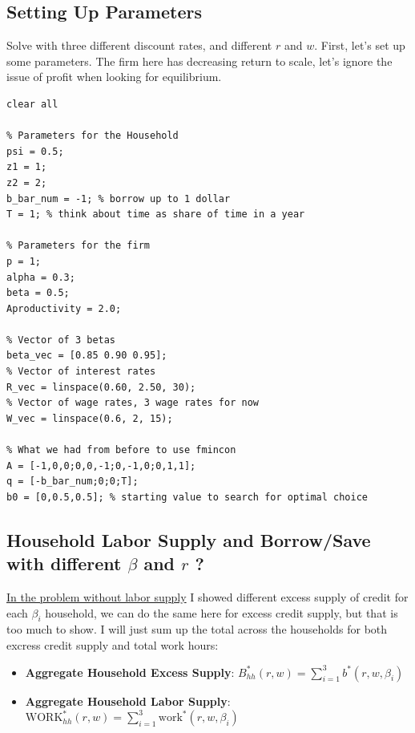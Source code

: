 \documentclass[
]{book}
\begin{document}
\hypertarget{setting-up-parameters}{%
\subsection{Setting Up Parameters}\label{setting-up-parameters}}

Solve with three different discount rates, and different \(r\) and \(w\).
First, let's set up some parameters. The firm here has decreasing return
to scale, let's ignore the issue of profit when looking for equilibrium.

\begin{verbatim}
clear all

% Parameters for the Household
psi = 0.5;
z1 = 1;
z2 = 2;
b_bar_num = -1; % borrow up to 1 dollar
T = 1; % think about time as share of time in a year

% Parameters for the firm
p = 1;
alpha = 0.3;
beta = 0.5;
Aproductivity = 2.0;

% Vector of 3 betas
beta_vec = [0.85 0.90 0.95];
% Vector of interest rates
R_vec = linspace(0.60, 2.50, 30);
% Vector of wage rates, 3 wage rates for now
W_vec = linspace(0.6, 2, 15);

% What we had from before to use fmincon
A = [-1,0,0;0,0,-1;0,-1,0;0,1,1];
q = [-b_bar_num;0;0;T];
b0 = [0,0.5,0.5]; % starting value to search for optimal choice
\end{verbatim}

\hypertarget{household-labor-supply-and-borrowsave-with-different-beta-and-r}{%
\subsection{\texorpdfstring{Household Labor Supply and Borrow/Save with different \(\beta\) and \(r\) ?}{Household Labor Supply and Borrow/Save with different \textbackslash beta and r ?}}\label{household-labor-supply-and-borrowsave-with-different-beta-and-r}}

\href{https://fanwangecon.github.io/Math4Econ/equilibrium/equilibrium_constrainedborrow.html}{In the problem without labor
supply}
I showed different excess supply of credit for each \(\beta_i\) household,
we can do the same here for excess credit supply, but that is too much
to show. I will just sum up the total across the households for both
excress credit supply and total work hours:

\begin{itemize}
\item
  \textbf{Aggregate Household Excess Supply}:
  \(B_{hh}^* (r,w)=\sum_{i=1}^3 b^* (r,w,\beta_i )\)
\item
  \textbf{Aggregate Household Labor Supply}:
  \({\textrm{WORK}}_{hh}^* (r,w)=\sum_{i=1}^3 {\textrm{work}}^* (r,w,\beta_i )\)
\end{itemize}
\end{document}
